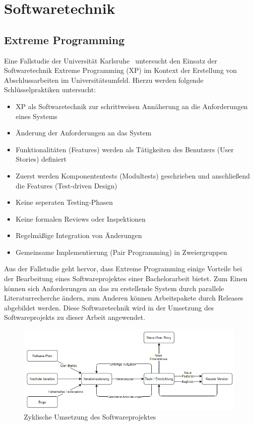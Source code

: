 \newpage

\section{Softwaretechnik}

\subsection*{Extreme Programming}
Eine Fallstudie der Universität Karlsruhe~\cite{muller_2001} untersucht den Einsatz der Softwaretechnik Extreme
Programming (XP) im Kontext der Erstellung von Abschlussarbeiten im Universitätsumfeld.
Hierzu werden folgende Schlüsselpraktiken untersucht:
\begin{itemize}
    \item XP als Softwaretechnik zur schrittweisen Annäherung an die Anforderungen eines Systems
    \item Änderung der Anforderungen an das System
    \item Funktionalitäten (Features) werden als Tätigkeiten des Benutzers (User Stories) definiert
    \item Zuerst werden Komponententests (Modultests) geschrieben und anschließend die Features (Test-driven Design)
    \item Keine seperaten Testing-Phasen
    \item Keine formalen Reviews oder Inspektionen
    \item Regelmäßige Integration von Änderungen
    \item Gemeinsame Implementierung (Pair Programming) in Zweiergruppen
\end{itemize}
Aus der Fallstudie geht hervor, dass Extreme Programming einige Vorteile bei der Bearbeitung eines Softwareprojektes
einer Bachelorarbeit bietet.
Zum Einen können sich Anforderungen an das zu erstellende System durch parallele Literaturrecherche ändern, zum
Anderen können Arbeitspakete durch Releases abgebildet werden.
Diese Softwaretechnik wird in der Umsetzung des Softwareprojekts zu dieser Arbeit angewendet.

\begin{figure}[H]
    \centering
    \includegraphics[width=12.8cm]{../images/extreme_programming.png}
    \caption{Zyklische Umsetzung des Softwareprojektes}
\end{figure}

